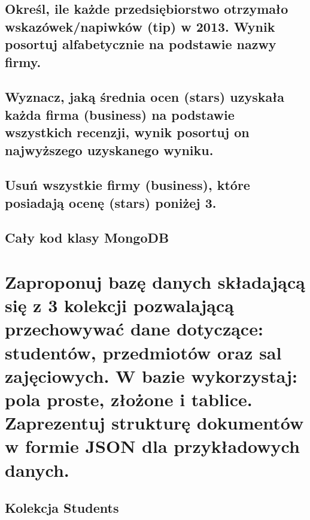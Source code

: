 \documentclass[a4paper, 11pt]{article}
\begin{document}
    

    \subsection{Określ, ile każde przedsiębiorstwo otrzymało wskazówek/napiwków (tip) w 2013.
    Wynik posortuj alfabetycznie na podstawie nazwy firmy. }

    

    \newpage

    \subsection{Wyznacz, jaką średnia ocen (stars) uzyskała każda firma (business) na podstawie
    wszystkich recenzji, wynik posortuj on najwyższego uzyskanego wyniku. }

    


    \subsection{Usuń wszystkie firmy (business), które posiadają ocenę (stars) poniżej 3. }

    

    \newpage

    \subsection{Cały kod klasy MongoDB}

    

    \newpage


    \section{Zaproponuj bazę danych składającą się z 3 kolekcji pozwalającą przechowywać dane
    dotyczące: studentów, przedmiotów oraz sal zajęciowych. W bazie wykorzystaj: pola
    proste, złożone i tablice. Zaprezentuj strukturę dokumentów w formie JSON dla
    przykładowych danych. }

    \subsection{Kolekcja Students}
\end{document}
